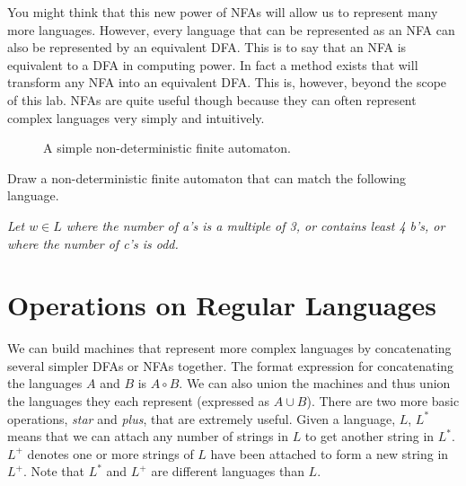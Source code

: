 You might think that this new power of NFAs will allow us to represent many more languages.  However, every language that can be represented as an NFA can also be represented by an equivalent DFA.  This is to say that an NFA is equivalent to a DFA in computing power.
In fact a method exists that will transform any NFA into an equivalent DFA.  This is, however, beyond the scope of this lab.
NFAs are quite useful though because they can often represent complex languages very simply and intuitively.
\begin{figure}
\caption{A simple non-deterministic finite automaton.}
\label{fig:simple_nfa}
\end{figure}

\begin{problem}
Draw a non-deterministic finite automaton that can match the following language.

\emph{Let $w \in L$ where the number of a's is a multiple of 3, or contains least 4 b's, or where the number of c's is odd.}
\end{problem}


\section*{Operations on Regular Languages}
We can build machines that represent more complex languages by concatenating several simpler DFAs or NFAs together.  The format expression for concatenating the languages $A$ and $B$ is $A \circ B$.  We can also union the machines and thus union the languages they each represent (expressed as $A \cup B$).  
There are two more basic operations, \emph{star} and \emph{plus}, that are extremely useful.  Given a language, $L$, $L^*$ means that we can attach any number of strings in $L$ to get another string in $L^*$.  $L^+$ denotes one or more strings of $L$ have been attached to form a new string in $L^+$.  Note that $L^*$ and $L^+$ are different languages than $L$.


